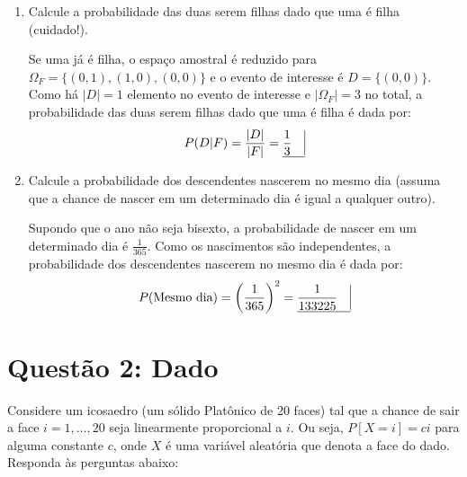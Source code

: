 \documentclass[12 pt]{article}
\begin{document}
\begin{enumerate}
    \item Calcule a probabilidade das duas serem filhas dado que uma é filha (cuidado!).
    \begin{tcolorbox}[colframe=black, title=Resposta:]
        Se uma já é filha, o espaço amostral é reduzido para $\Omega_F = \{(0,1), (1,0), (0,0)\}$ e o evento de interesse é $D = \{(0,0)\}$. Como há $|D| = 1$ elemento no evento de interesse e $|\Omega_F| = 3$ no total, a probabilidade das duas serem filhas dado que uma é filha é dada por:
        $$P(D|F) = \frac{|D|}{|F|} = \underline{ \frac{1}{3} \quad \vline}$$
    \end{tcolorbox}
    \newpage
    \item Calcule a probabilidade dos descendentes nascerem no mesmo dia (assuma que a chance de nascer em um determinado dia é igual a qualquer outro).
    \begin{tcolorbox}[colframe=black, title=Resposta:]
        Supondo que o ano não seja bisexto, a probabilidade de nascer em um determinado dia é $\frac{1}{365}$. Como os nascimentos são independentes, a probabilidade dos descendentes nascerem no mesmo dia é dada por:
        $$P(\text{Mesmo dia}) = \left(\frac{1}{365}\right)^2 = \underline{ \frac{1}{133225} \quad \vline}$$
    \end{tcolorbox}
\end{enumerate}

\section*{Questão 2: Dado}
Considere um icosaedro (um sólido Platônico de 20 faces) tal que a chance de sair a face $i = 1, \dots, 20$ seja
linearmente proporcional a $i$. Ou seja, $P [X = i] = ci$ para alguma constante $c$, onde $X$ é uma variável
aleatória que denota a face do dado. Responda às perguntas abaixo:
\end{document}
